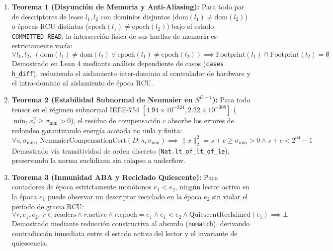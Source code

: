 \begin{enumerate}
    \item \textbf{Teorema 1 (Disyunción de Memoria y Anti-Aliasing):} Para todo par de descriptores de lease $l_1, l_2$ con dominios disjuntos ($\mathrm{dom}(l_1) \neq \mathrm{dom}(l_2)$) o épocas RCU distintas ($\mathrm{epoch}(l_1) \neq \mathrm{epoch}(l_2)$) bajo el estado \texttt{COMMITTED\_READ}, la intersección física de sus huellas de memoria es estrictamente vacía:
    \begin{equation}
    \forall l_1, l_2,\ (\mathrm{dom}(l_1) \neq \mathrm{dom}(l_2) \lor \mathrm{epoch}(l_1) \neq \mathrm{epoch}(l_2)) \implies \mathrm{Footprint}(l_1) \cap \mathrm{Footprint}(l_2) = \emptyset
    \label{eq:lean_disjointness}
    \end{equation}
    Demostrado en Lean 4 mediante análisis dependiente de casos (\texttt{cases h\_diff}), reduciendo el aislamiento inter-dominio al controlador de hardware y el intra-dominio al aislamiento de época RCU.

    \item \textbf{Teorema 2 (Estabilidad Subnormal de Neumaier en $S^{D-1}$):} Para todo tensor en el régimen subnormal IEEE-754 $[4.94 \times 10^{-324}, 2.22 \times 10^{-308}]$ ($\min_i x_i^2 \ge \sigma_{\min} > 0$), el residuo de compensación $c$ absorbe los errores de redondeo garantizando energía acotada no nula y finita:
    \begin{equation}
    \forall s, \sigma_{\min},\ \mathrm{NeumaierCompensationCert}(D, s, \sigma_{\min}) \implies \|x\|_2^2 = s + c \ge \sigma_{\min} > 0 \land s + c < 2^{64}-1
    \label{eq:lean_neumaier}
    \end{equation}
    Demostrado vía transitividad de orden discreto (\texttt{Nat.lt\_of\_lt\_of\_le}), preservando la norma euclidiana sin colapso a underflow.

    \item \textbf{Teorema 3 (Inmunidad ABA y Reciclado Quiescente):} Para contadores de época estrictamente monótonos $e_1 < e_2$, ningún lector activo en la época $e_1$ puede observar un descriptor reciclado en la época $e_2$ sin violar el período de gracia RCU:
    \begin{equation}
    \forall r, e_1, e_2,\ r \in \mathrm{readers} \land r.\mathrm{active} \land r.\mathrm{epoch} = e_1 \land e_1 < e_2 \land \mathrm{QuiescentReclaimed}(e_1) \implies \bot
    \label{eq:lean_aba}
    \end{equation}
    Demostrado mediante reducción constructiva al absurdo (\texttt{nomatch}), derivando contradicción inmediata entre el estado activo del lector y el invariante de quiescencia.


\end{enumerate}

